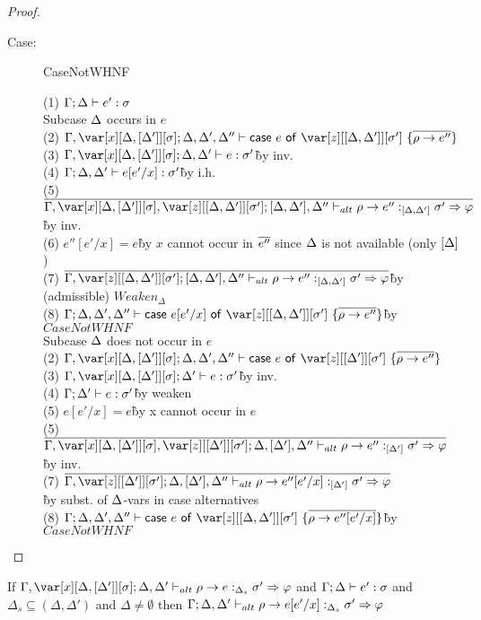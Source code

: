 \begin{proof}
\begin{description}
\item[Case:] CaseNotWHNF
\begin{tabbing}
    (1) $\Gamma;\Delta\vdash e' :\sigma$\\
    Subcase $\Delta$ occurs in $e$\\
    (2) $\G,\xD; \D, \D', \D'' \vdash \ccase{e}{\z[\irr{\D,\D'}][\s']~\{\ov{\rho\to e''}\}}$\\
    (3) $\G,\xD; \D, \D' \vdash e : \s'$\` by inv.\\
    (4) $\Gamma; \Delta,\Delta' \vdash e[e'/x] : \sigma'$\` by i.h.\\
    (5) $\ov{\G,\xD,\z[\irr{\D,\D'}][\s']; [\D,\D'],\D'' \vdash_{alt} \rho \to e'' :_{\irr{\D,\D'}} \s'\Rightarrow\vp}$\` by inv.\\
    (6) $e''[e'/x] = e$\` by $x$ cannot occur in $\overline{e''}$ since $\Delta$ is not available (only $\left[\Delta\right]$)\\
    (7) $\ov{\G,\z[\irr{\D,\D'}][\s']; [\D,\D'],\D'' \vdash_{alt} \rho \to e'' :_{\irr{\D,\D'}} \s'\Rightarrow\vp}$\` by (admissible) $Weaken_\Delta$\\
    (8) $\G; \D, \D', \D'' \vdash \ccase{e[e'/x]}{\z[\irr{\D,\D'}][\s']~\{\ov{\rho\to e''}\}}$\`by $CaseNotWHNF$\\
    Subcase $\Delta$ does not occur in $e$\\
    (2) $\G,\xD; \D, \D', \D'' \vdash \ccase{e}{\z[\irr{\D'}][\s']~\{\ov{\rho\to e''}\}}$\\
    (3) $\G,\xD; \D' \vdash e : \s'$\` by inv.\\
    (4) $\Gamma; \Delta' \vdash e : \sigma'$\` by weaken\\
    (5) $e[e'/x] = e$\` by x cannot occur in $e$\\
    (5) $\ov{\G,\xD,\z[\irr{\D'}][\s']; \D,[\D'],\D'' \vdash_{alt} \rho \to e'' :_{\irr{\D'}} \s'\Rightarrow\vp}$\` by inv.\\
    (7) $\ov{\G,\z[\irr{\D'}][\s']; \D,[\D'],\D'' \vdash_{alt} \rho \to e''[e'/x] :_{\irr{\D'}} \s'\Rightarrow\vp}$\\\` by subst. of $\Delta$-vars in case alternatives\\
    (8) $\G; \D, \D', \D'' \vdash \ccase{e}{\z[\irr{\D,\D'}][\s']~\{\ov{\rho\to e''[e'/x]}\}}$\`by $CaseNotWHNF$\\
\end{tabbing}

\end{description}

\end{proof}


\begin{sublemma}
If $\G,\xD; \D,\D' \vdash_{alt} \rho \to e :_{\Delta_s} \s' \Rightarrow \vp$ and
    $\Gamma; \Delta \vdash e' : \sigma$ and $\Delta_s \subseteq (\Delta,\Delta')$ and $\Delta \neq \emptyset$ then $\Gamma; \Delta, \Delta' \vdash_{alt} \rho \to e[e'/x] :_{\Delta_s} \sigma' \Rightarrow \varphi$
\end{sublemma}


